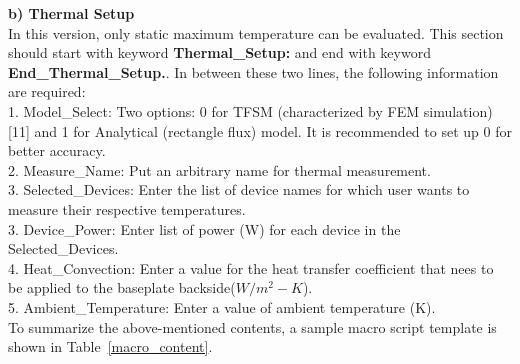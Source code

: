 \documentclass[11pt]{article}
\begin{document}
\textbf{b) Thermal Setup}\\
In this version, only static maximum temperature can be evaluated.
This section should start with keyword \textbf{Thermal\_Setup:} and end with keyword \textbf{End\_Thermal\_Setup.}. In between these two lines, the following information are required:\\
1. Model\_Select: Two options: 0 for TFSM (characterized by FEM simulation)[11] and 1 for Analytical (rectangle flux) model. It is recommended to set up 0 for better accuracy. \\
2. Measure\_Name: Put an arbitrary name for thermal measurement.\\
3. Selected\_Devices: Enter the list of device names for which user wants to measure their respective temperatures.\\
3. Device\_Power: Enter list of power (W) for each device in the Selected\_Devices.\\
4. Heat\_Convection: Enter a value for the heat transfer coefficient that nees to be applied to the baseplate backside($W/m^2-K$).\\
5. Ambient\_Temperature: Enter a value of ambient temperature (K).\\


To summarize the above-mentioned contents, a sample macro script template is shown in Table~\ref{macro_content}.
\end{document}
